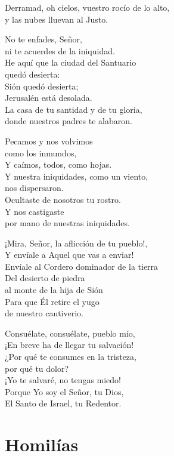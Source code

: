 \begin{patercite}
	
	Derramad, oh cielos, vuestro rocío de lo alto, \\y las nubes lluevan al Justo.
	
	No te enfades, Señor, \\ni te acuerdes de la iniquidad. \\He aquí que la ciudad del Santuario \\quedó desierta: \\Sión quedó desierta; \\Jerusalén está desolada. \\La casa de tu santidad y de tu gloria, \\donde nuestros padres te alabaron.
	
	Pecamos y nos volvimos \\como los inmundos, \\Y caímos, todos, como hojas. \\Y nuestra iniquidades, como un viento, \\nos dispersaron. \\Ocultaste de nosotros tu rostro. \\Y nos castigaste \\por mano de nuestras iniquidades.
	
	¡Mira, Señor, la aflicción de tu pueblo!, \\Y envíale a Aquel que vas a enviar! \\Envíale al Cordero dominador de la tierra \\Del desierto de piedra \\al monte de la hija de Sión \\Para que Él retire el yugo \\de nuestro cautiverio.
	
	Consuélate, consuélate, pueblo mío, \\¡En breve ha de llegar tu salvación! \\¿Por qué te consumes en la tristeza, \\por qué tu dolor? \\¡Yo te salvaré, no tengas miedo! \\Porque Yo soy el Señor, tu Dios, \\El Santo de Israel, tu Redentor.\strut
\end{patercite}

\newsection

\section{Homilías}


